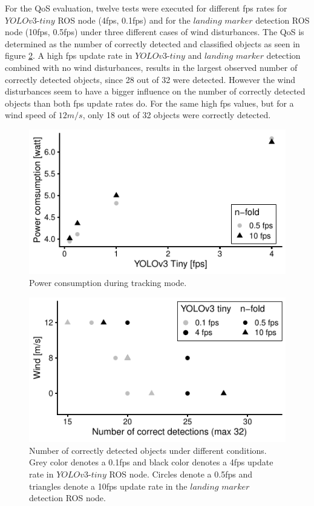 \documentclass[conference]{IEEEtran}
\begin{document}
For the QoS evaluation, twelve tests were executed for different 
fps rates for $YOLOv3$-$tiny$ ROS node (4fps, 0.1fps) and for 
the $landing$ $marker$ detection ROS node (10fps, 0.5fps) under 
three different cases of wind disturbances. 
The QoS is determined as the number of correctly detected and 
classified objects as seen in figure \ref{fig:NCorrectObjectDetections}. A high fps update rate in $YOLOv3$-$tiny$ and $landing$ $marker$ detection combined with no wind disturbances, results in the largest observed number of correctly detected objects, since 28 out of 32 were detected. However the wind disturbances seem to have a bigger influence on the number of correctly detected objects than both fps update rates do. For the same high fps values, but for a wind speed of $12 m/s$, only 18 out of 32 objects were correctly detected. 



\begin{figure}[h]
\centering
\includegraphics{data_visualization/PowerDetection.pdf}
\caption{Power consumption during tracking mode.}
\label{fig:PowerDuringTracking}
\end{figure}

\begin{figure}[h]
\centering
\includegraphics{data_visualization/QoSDetection.pdf}
\caption{Number of correctly detected objects
under different conditions. 
Grey color denotes a 0.1fps and black color denotes a 4fps 
update rate in $YOLOv3$-$tiny$ ROS node. 
Circles denote a 0.5fps and triangles denote a 10fps update 
rate in the $landing$ $marker$ detection ROS node.}
\label{fig:NCorrectObjectDetections}
\end{figure}
\end{document}
